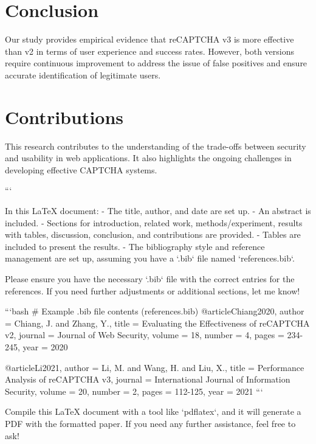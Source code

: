 \section{Conclusion}
Our study provides empirical evidence that reCAPTCHA v3 is more effective than v2 in terms of user experience and success rates. However, both versions require continuous improvement to address the issue of false positives and ensure accurate identification of legitimate users.

\section{Contributions}
This research contributes to the understanding of the trade-offs between security and usability in web applications. It also highlights the ongoing challenges in developing effective CAPTCHA systems.





```

In this LaTeX document:
- The title, author, and date are set up.
- An abstract is included.
- Sections for introduction, related work, methods/experiment, results with tables, discussion, conclusion, and contributions are provided.
- Tables are included to present the results.
- The bibliography style and reference management are set up, assuming you have a `.bib` file named `references.bib`.

Please ensure you have the necessary `.bib` file with the correct entries for the references. If you need further adjustments or additional sections, let me know! 

```bash
# Example .bib file contents (references.bib)
@article{Chiang2020,
    author = {Chiang, J. and Zhang, Y.},
    title = {{Evaluating the Effectiveness of reCAPTCHA v2}},
    journal = {Journal of Web Security},
    volume = {18},
    number = {4},
    pages = {234-245},
    year = {2020}
}

@article{Li2021,
    author = {Li, M. and Wang, H. and Liu, X.},
    title = {{Performance Analysis of reCAPTCHA v3}},
    journal = {International Journal of Information Security},
    volume = {20},
    number = {2},
    pages = {112-125},
    year = {2021}
}
```

Compile this LaTeX document with a tool like `pdflatex`, and it will generate a PDF with the formatted paper. If you need any further assistance, feel free to ask!
